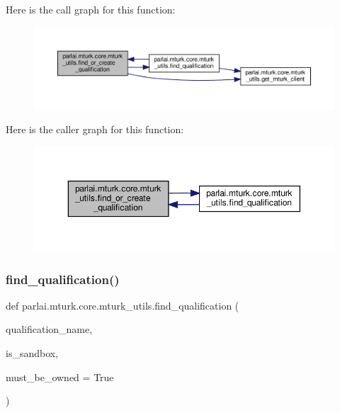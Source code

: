 Here is the call graph for this function\+:
\nopagebreak
\begin{figure}[H]
\begin{center}
\leavevmode
\includegraphics[width=350pt]{namespaceparlai_1_1mturk_1_1core_1_1mturk__utils_ae5d70edec5817ee9e05b9675320859d7_cgraph}
\end{center}
\end{figure}
Here is the caller graph for this function\+:
\nopagebreak
\begin{figure}[H]
\begin{center}
\leavevmode
\includegraphics[width=350pt]{namespaceparlai_1_1mturk_1_1core_1_1mturk__utils_ae5d70edec5817ee9e05b9675320859d7_icgraph}
\end{center}
\end{figure}
\mbox{\label{namespaceparlai_1_1mturk_1_1core_1_1mturk__utils_a54121023abc81124ba03cc50d5f23af3}} 
\subsubsection{\texorpdfstring{find\+\_\+qualification()}{find\_qualification()}}
{\footnotesize\ttfamily def parlai.\+mturk.\+core.\+mturk\+\_\+utils.\+find\+\_\+qualification (\begin{DoxyParamCaption}\item[{}]{qualification\+\_\+name,  }\item[{}]{is\+\_\+sandbox,  }\item[{}]{must\+\_\+be\+\_\+owned = {\ttfamily True} }\end{DoxyParamCaption})}

